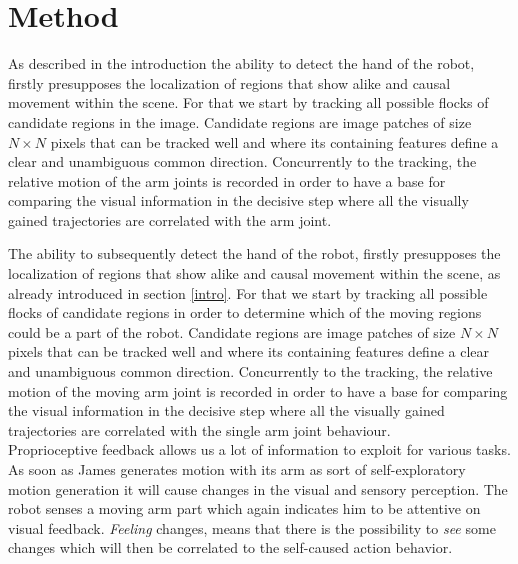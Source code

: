 \section{Method}\label{method}
As described in the introduction the ability to detect the hand of the robot, 
firstly presupposes the localization of regions that show alike and causal 
movement within the scene. For that we start by tracking all possible flocks 
of candidate regions in the image. Candidate regions are image patches of 
size $N \times N$ pixels that can be tracked well and where its containing 
features define a clear and unambiguous common direction. Concurrently to 
the tracking, the relative motion of the arm joints is recorded in order 
to have a base for comparing the visual information in the decisive step 
where all the visually gained trajectories are correlated with the arm joint. 

The ability to subsequently detect the hand of the robot, firstly presupposes 
the localization of regions that show alike and causal movement within the scene, 
as already introduced in section \ref{intro}. For that we start by tracking all 
possible flocks of candidate regions in order to determine which of the moving 
regions could be a part of the robot. Candidate regions are image patches of size 
$N \times N$ pixels that can be tracked well and where its containing features 
define a clear and unambiguous common direction. Concurrently to the tracking, 
the relative motion of the moving arm joint is recorded in order to have a base 
for comparing the visual information in the decisive step where all the visually 
gained trajectories are correlated with the single arm joint behaviour. \\ \newline
%
%
Proprioceptive feedback allows us a lot of information to exploit for various 
tasks. As soon as James generates motion with its arm as sort of 
self-exploratory motion generation it will cause changes in the visual and 
sensory perception. The robot senses a moving arm part which again indicates 
him to be attentive on visual feedback. \textit{Feeling} changes, means that 
there is the possibility to \textit{see} some changes which will then be 
correlated to the self-caused action behavior.
%
%
